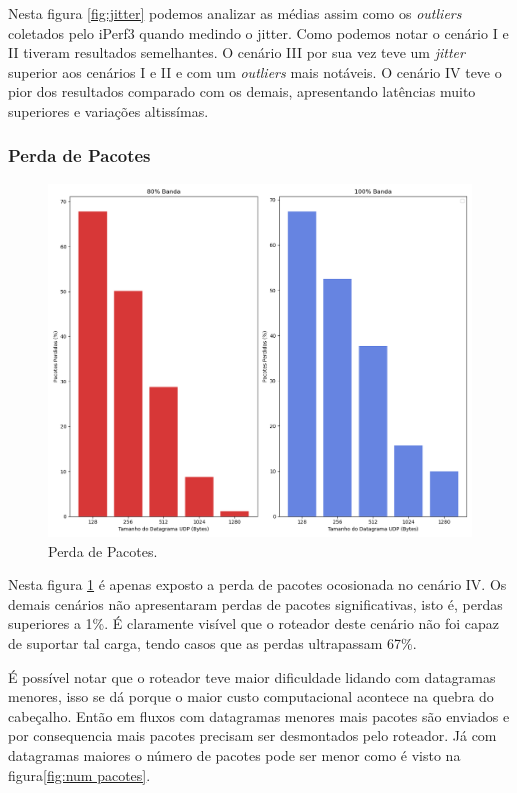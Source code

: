 Nesta figura \ref{fig:jitter} podemos analizar as médias assim como os \textit{outliers} coletados pelo iPerf3 quando medindo o jitter. Como podemos notar o cenário I e II tiveram resultados semelhantes. O cenário III por sua vez teve um \textit{jitter} superior aos cenários I e II e com um \textit{outliers} mais notáveis. O cenário IV teve o pior dos resultados comparado com os demais, apresentando latências muito superiores e variações altissímas.

\subsubsection{Perda de Pacotes}

\begin{figure}[H]
    \centering
    \includegraphics[width=0.9\linewidth]{sources/fig-pacotes-perdidos.png}
    \caption{Perda de Pacotes.}
    \label{fig:perda}
\end{figure}

Nesta figura \ref{fig:perda} é apenas exposto a perda de pacotes ocosionada no cenário IV. Os demais cenários não apresentaram perdas de pacotes significativas, isto é, perdas superiores a 1\%. É claramente visível que o roteador deste cenário não foi capaz de suportar tal carga, tendo casos que as perdas ultrapassam 67\%. 

É possível notar que o roteador teve maior dificuldade lidando com datagramas menores, isso se dá porque o maior custo computacional acontece na quebra do cabeçalho. Então em fluxos com datagramas menores mais pacotes são enviados e por consequencia mais pacotes precisam ser desmontados pelo roteador. Já com datagramas maiores o número de pacotes pode ser menor como é visto na figura\ref{fig:num pacotes}.


